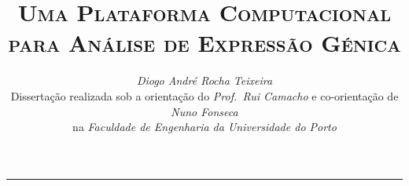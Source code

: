 \documentclass[9pt,a4paper]{extarticle}
\begin{document}
\title{\vspace*{-8mm}\textbf{\textsc{Uma Plataforma Computacional\\para Análise de Expressão Génica}}}
\author{\emph{Diogo André Rocha Teixeira}\\[2mm]
  \small{Dissertação realizada sob a orientação do \emph{Prof.\ Rui Camacho} e co-orientação de \emph{Nuno Fonseca}}\\
\small{na \emph{Faculdade de Engenharia da Universidade do Porto}}}
\date{}
\maketitle
\thispagestyle{empty}

\vspace*{-4mm}\noindent\rule{\textwidth}{0.4pt}\vspace*{4mm}
\end{document}
